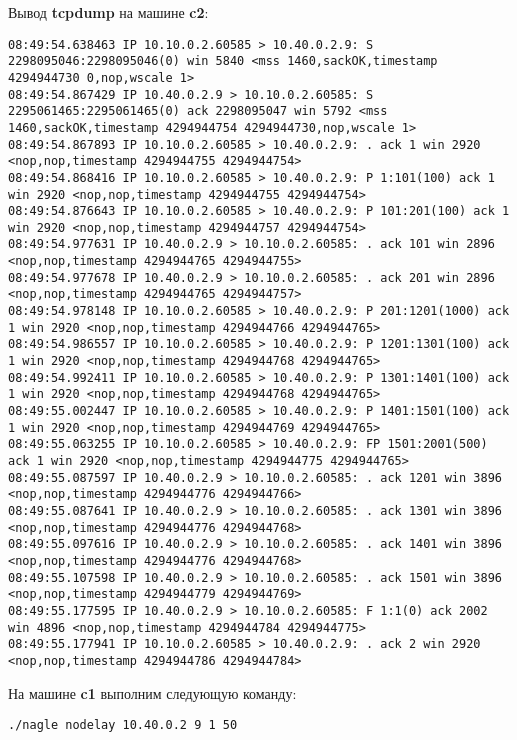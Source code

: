 \documentclass[a4paper,12pt]{article}
\begin{document}
Вывод \textbf{tcpdump} на машине \textbf{c2}:
\begin{Verbatim}
08:49:54.638463 IP 10.10.0.2.60585 > 10.40.0.2.9: S 2298095046:2298095046(0) win 5840 <mss 1460,sackOK,timestamp 4294944730 0,nop,wscale 1>
08:49:54.867429 IP 10.40.0.2.9 > 10.10.0.2.60585: S 2295061465:2295061465(0) ack 2298095047 win 5792 <mss 1460,sackOK,timestamp 4294944754 4294944730,nop,wscale 1>
08:49:54.867893 IP 10.10.0.2.60585 > 10.40.0.2.9: . ack 1 win 2920 <nop,nop,timestamp 4294944755 4294944754>
08:49:54.868416 IP 10.10.0.2.60585 > 10.40.0.2.9: P 1:101(100) ack 1 win 2920 <nop,nop,timestamp 4294944755 4294944754>
08:49:54.876643 IP 10.10.0.2.60585 > 10.40.0.2.9: P 101:201(100) ack 1 win 2920 <nop,nop,timestamp 4294944757 4294944754>
08:49:54.977631 IP 10.40.0.2.9 > 10.10.0.2.60585: . ack 101 win 2896 <nop,nop,timestamp 4294944765 4294944755>
08:49:54.977678 IP 10.40.0.2.9 > 10.10.0.2.60585: . ack 201 win 2896 <nop,nop,timestamp 4294944765 4294944757>
08:49:54.978148 IP 10.10.0.2.60585 > 10.40.0.2.9: P 201:1201(1000) ack 1 win 2920 <nop,nop,timestamp 4294944766 4294944765>
08:49:54.986557 IP 10.10.0.2.60585 > 10.40.0.2.9: P 1201:1301(100) ack 1 win 2920 <nop,nop,timestamp 4294944768 4294944765>
08:49:54.992411 IP 10.10.0.2.60585 > 10.40.0.2.9: P 1301:1401(100) ack 1 win 2920 <nop,nop,timestamp 4294944768 4294944765>
08:49:55.002447 IP 10.10.0.2.60585 > 10.40.0.2.9: P 1401:1501(100) ack 1 win 2920 <nop,nop,timestamp 4294944769 4294944765>
08:49:55.063255 IP 10.10.0.2.60585 > 10.40.0.2.9: FP 1501:2001(500) ack 1 win 2920 <nop,nop,timestamp 4294944775 4294944765>
08:49:55.087597 IP 10.40.0.2.9 > 10.10.0.2.60585: . ack 1201 win 3896 <nop,nop,timestamp 4294944776 4294944766>
08:49:55.087641 IP 10.40.0.2.9 > 10.10.0.2.60585: . ack 1301 win 3896 <nop,nop,timestamp 4294944776 4294944768>
08:49:55.097616 IP 10.40.0.2.9 > 10.10.0.2.60585: . ack 1401 win 3896 <nop,nop,timestamp 4294944776 4294944768>
08:49:55.107598 IP 10.40.0.2.9 > 10.10.0.2.60585: . ack 1501 win 3896 <nop,nop,timestamp 4294944779 4294944769>
08:49:55.177595 IP 10.40.0.2.9 > 10.10.0.2.60585: F 1:1(0) ack 2002 win 4896 <nop,nop,timestamp 4294944784 4294944775>
08:49:55.177941 IP 10.10.0.2.60585 > 10.40.0.2.9: . ack 2 win 2920 <nop,nop,timestamp 4294944786 4294944784>
\end{Verbatim}

На машине \textbf{c1} выполним следующую команду:
\begin{Verbatim}
./nagle nodelay 10.40.0.2 9 1 50
\end{Verbatim}
\end{document}
